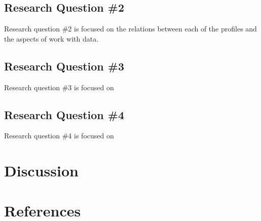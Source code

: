 \documentclass[]{book}
\theoremstyle{definition}
\theoremstyle{definition}
\theoremstyle{definition}
\theoremstyle{remark}
\begin{document}
\section{Research Question \#2}\label{research-question-2}

Research question \#2 is focused on the relations between each of the
profiles and the aspects of work with data.

\section{Research Question \#3}\label{research-question-3}

Research question \#3 is focused on

\section{Research Question \#4}\label{research-question-4}

Research question \#4 is focused on

\chapter{Discussion}\label{discussion}

\chapter{References}\label{references}
\end{document}
